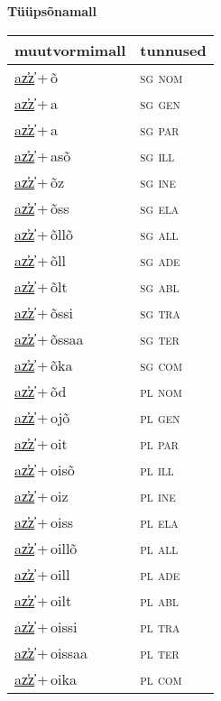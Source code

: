 
\vspace{1.8em}
\begin{minipage}{\textwidth}
\textbf{Tüüpsõnamall \,}\\

\begin{sideways}
\begin{tabular}{l l}
muutvormimall & tunnused \\
\hline
\underline{az̕z̕}\,+\,õ & \textsc{ sg nom } \\
\underline{az̕z̕}\,+\,a & \textsc{ sg gen } \\
\underline{az̕z̕}\,+\,a & \textsc{ sg par } \\
\underline{az̕z̕}\,+\,asõ & \textsc{ sg ill } \\
\underline{az̕z̕}\,+\,õz & \textsc{ sg ine } \\
\underline{az̕z̕}\,+\,õss & \textsc{ sg ela } \\
\underline{az̕z̕}\,+\,õllõ & \textsc{ sg all } \\
\underline{az̕z̕}\,+\,õll & \textsc{ sg ade } \\
\underline{az̕z̕}\,+\,õlt & \textsc{ sg abl } \\
\underline{az̕z̕}\,+\,õssi & \textsc{ sg tra } \\
\underline{az̕z̕}\,+\,õssaa & \textsc{ sg ter } \\
\underline{az̕z̕}\,+\,õka & \textsc{ sg com } \\
\underline{az̕z̕}\,+\,õd & \textsc{ pl nom } \\
\underline{az̕z̕}\,+\,ojõ & \textsc{ pl gen } \\
\underline{az̕z̕}\,+\,oit & \textsc{ pl par } \\
\underline{az̕z̕}\,+\,oisõ & \textsc{ pl ill } \\
\underline{az̕z̕}\,+\,oiz & \textsc{ pl ine } \\
\underline{az̕z̕}\,+\,oiss & \textsc{ pl ela } \\
\underline{az̕z̕}\,+\,oillõ & \textsc{ pl all } \\
\underline{az̕z̕}\,+\,oill & \textsc{ pl ade } \\
\underline{az̕z̕}\,+\,oilt & \textsc{ pl abl } \\
\underline{az̕z̕}\,+\,oissi & \textsc{ pl tra } \\
\underline{az̕z̕}\,+\,oissaa & \textsc{ pl ter } \\
\underline{az̕z̕}\,+\,oika & \textsc{ pl com } \\
\end{tabular}
\end{sideways}
\label{tab:tüüpsõnamall-az̕z̕õ}

\end{minipage}

